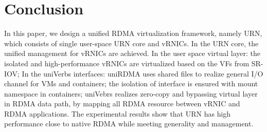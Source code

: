 
\section{Conclusion}
In this paper, we design a unified RDMA virtualization framework, namely URN, which consists of single user-space URN core and vRNICs. In the URN core, the unified management for vRNICs are achieved. In the user space virtual layer: the isolated and high-performance vRNICs are virtualized based on the VFs from SR-IOV; In the uniVerbs interfaces: uniRDMA uses shared files to realize general I/O channel for VMs and containers; the isolation of interface is ensured with mount namespace in containers; uniVebrs realizes zero-copy and bypassing virtual layer in RDMA data path, by mapping all RDMA resource between vRNIC and RDMA applications. The experimental results show that URN has high performance close to native RDMA while meeting generality and management.
